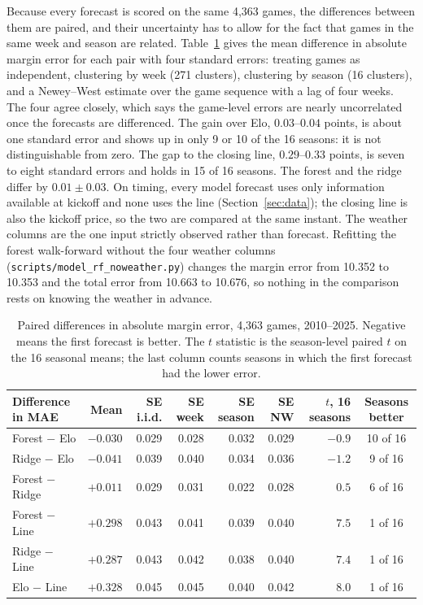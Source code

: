 Because every forecast is scored on the same 4,363 games, the differences between them are paired, and their uncertainty has to allow for the fact that games in the same week and season are related. Table~\ref{tab:mae_diff} gives the mean difference in absolute margin error for each pair with four standard errors: treating games as independent, clustering by week (271 clusters), clustering by season (16 clusters), and a Newey--West estimate over the game sequence with a lag of four weeks. The four agree closely, which says the game-level errors are nearly uncorrelated once the forecasts are differenced. The gain over Elo, $0.03$--$0.04$ points, is about one standard error and shows up in only 9 or 10 of the 16 seasons: it is not distinguishable from zero. The gap to the closing line, $0.29$--$0.33$ points, is seven to eight standard errors and holds in 15 of 16 seasons. The forest and the ridge differ by $0.01 \pm 0.03$. On timing, every model forecast uses only information available at kickoff and none uses the line (Section~\ref{sec:data}); the closing line is also the kickoff price, so the two are compared at the same instant. The weather columns are the one input strictly observed rather than forecast. Refitting the forest walk-forward without the four weather columns (\texttt{scripts/model\_rf\_noweather.py}) changes the margin error from 10.352 to 10.353 and the total error from 10.663 to 10.676, so nothing in the comparison rests on knowing the weather in advance.

\begin{table}[H]
\centering
\footnotesize
\setlength{\tabcolsep}{4pt}
\begin{tabular}{lrrrrrrc}
\toprule
\textbf{Difference in MAE} & \textbf{Mean} & \textbf{SE i.i.d.} & \textbf{SE week} & \textbf{SE season} & \textbf{SE NW} & \textbf{$t$, 16 seasons} & \textbf{Seasons better} \\
\midrule
Forest $-$ Elo & $-0.030$ & 0.029 & 0.028 & 0.032 & 0.029 & $-0.9$ & 10 of 16 \\
Ridge $-$ Elo & $-0.041$ & 0.039 & 0.040 & 0.034 & 0.036 & $-1.2$ & 9 of 16 \\
Forest $-$ Ridge & $+0.011$ & 0.029 & 0.031 & 0.022 & 0.028 & $0.5$ & 6 of 16 \\
Forest $-$ Line & $+0.298$ & 0.043 & 0.041 & 0.039 & 0.040 & $7.5$ & 1 of 16 \\
Ridge $-$ Line & $+0.287$ & 0.043 & 0.042 & 0.038 & 0.040 & $7.4$ & 1 of 16 \\
Elo $-$ Line & $+0.328$ & 0.045 & 0.045 & 0.040 & 0.042 & $8.0$ & 1 of 16 \\
\bottomrule
\end{tabular}
\caption{Paired differences in absolute margin error, 4,363 games, 2010--2025. Negative means the first forecast is better. The $t$ statistic is the season-level paired $t$ on the 16 seasonal means; the last column counts seasons in which the first forecast had the lower error.}
\label{tab:mae_diff}
\end{table}

